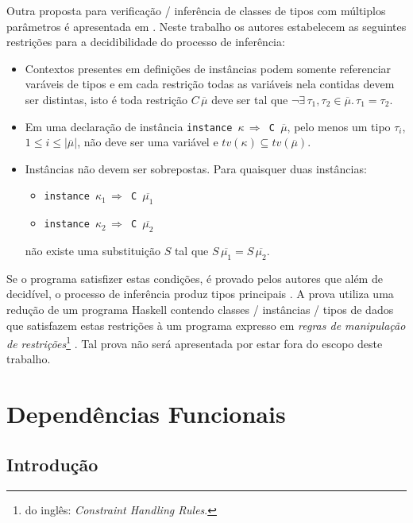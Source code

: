 Outra proposta para verifica\c{c}\~ao / infer\^encia de classes de tipos com m\'ultiplos par\^ametros \'e apresentada 
em \cite{Sulzmann06c}. Neste trabalho os autores estabelecem as seguintes restri\c{c}\~oes para a decidibilidade do
processo de infer\^encia:
\begin{itemize}
	\item Contextos presentes em defini\c{c}\~oes de inst\^ancias podem somente referenciar var\'aveis de tipos e em
	      cada restri\c{c}\~ao todas as vari\'aveis nela contidas devem ser distintas, isto \'e toda restri\c{c}\~ao
	      $C\,\overline{\mu}$ deve ser tal que $\neg\exists\,\tau_{1},\tau_{2}\in\overline{\mu}.\,\tau_{1} = \tau_{2}$.
	\item Em uma declara\c{c}\~ao de inst\^ancia \texttt{instance $\kappa\,\Rightarrow$ C $\overline{\mu}$}, 
	      pelo menos um tipo $\tau_{i}$, 
	      $1\leq i\leq |\overline{\mu}|$, n\~ao deve ser uma vari\'avel e $tv(\kappa)\subseteq tv(\overline{\mu})$.
	\item Inst\^ancias n\~ao devem ser sobrepostas. Para quaisquer duas inst\^ancias:
	\begin{itemize}
		\item[\ ] \texttt{instance $\kappa_{1}\,\Rightarrow$ C $\overline{\mu_{1}}$}
		\item[\ ] \texttt{instance $\kappa_{2}\,\Rightarrow$ C $\overline{\mu_{2}}$}
	\end{itemize} 
	      n\~ao existe uma substitui\c{c}\~ao $S$ tal que $S\,\overline{\mu_{1}} = S\,\overline{\mu_{2}}$.
\end{itemize}
Se o programa satisfizer estas condi\c{c}\~oes, \'e provado pelos autores que al\'em de decid\'ivel, o processo de 
infer\^encia produz tipos principais \cite{Sulzmann06c}. A prova utiliza uma redu\c{c}\~ao de um programa Haskell
contendo classes / inst\^ancias / tipos de dados que satisfazem estas restri\c{c}\~oes \`a um programa expresso em
\emph{regras de manipula\c{c}\~ao de restri\c{c}\~oes}\footnote{do ingl\^es: \emph{Constraint Handling Rules}.}
\cite{Fruhwirth95}. Tal prova n\~ao ser\'a apresentada por estar fora do escopo deste trabalho.

\section{Depend\^encias Funcionais}\label{fundeps}

\subsection{Introdu\c{c}\~ao}

